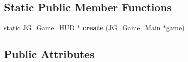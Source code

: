 \subsection*{Static Public Member Functions}
\begin{DoxyCompactItemize}
\item 
\hypertarget{class_j_g___game___h_u_d_aa4c8aae108b41d13fdd5480abc34a595}{static \hyperlink{class_j_g___game___h_u_d}{J\-G\-\_\-\-Game\-\_\-\-H\-U\-D} $\ast$ {\bfseries create} (\hyperlink{class_j_g___game___main}{J\-G\-\_\-\-Game\-\_\-\-Main} $\ast$game)}\label{class_j_g___game___h_u_d_aa4c8aae108b41d13fdd5480abc34a595}

\end{DoxyCompactItemize}
\subsection*{Public Attributes}

